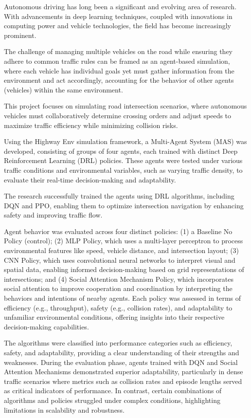 Autonomous driving has long been a significant and evolving area of research. With advancements in deep learning techniques, coupled with 
innovations in computing power and vehicle technologies, the field has become increasingly prominent. 

The challenge of managing multiple vehicles on the road while ensuring they adhere to common traffic rules can be framed as an agent-based simulation,
 where each vehicle has individual goals yet must gather information from the environment and act accordingly, accounting for the behavior of other 
 agents (vehicles) within the same environment.

This project focuses on simulating road intersection scenarios, where autonomous vehicles must collaboratively determine crossing orders and adjust 
speeds to maximize traffic efficiency while minimizing collision risks. 

Using the Highway Env simulation framework, a Multi-Agent System (MAS) was developed, consisting of groups of four agents, each trained with 
distinct Deep Reinforcement Learning (DRL) policies. These agents were tested under various traffic conditions and environmental variables, 
such as varying traffic density, to evaluate their real-time decision-making and adaptability. 

The research successfully trained the agents using DRL algorithms, including DQN and PPO, enabling them to optimize intersection navigation 
by enhancing safety and improving traffic flow. 

Agent behavior was evaluated across four distinct policies: 
(1) a Baseline No Policy (control); (2) MLP Policy, which uses a multi-layer perceptron to process environmental features like speed, vehicle 
distance, and intersection layout; (3) CNN Policy, which uses convolutional neural networks to interpret visual and spatial data, 
enabling informed decision-making based on grid representations of intersections; and (4) Social Attention Mechanism Policy, 
which incorporates social attention to improve cooperation and coordination by interpreting the behaviors and intentions of nearby agents. 
Each policy was assessed in terms of efficiency (e.g., throughput), safety (e.g., collision rates), and adaptability to unfamiliar environmental 
conditions, offering insights into their respective decision-making capabilities.

The algorithms were classified into performance categories such as efficiency, safety, and adaptability, providing a clear understanding of 
their strengths and weaknesses. 
During the evaluation phase, agents trained with DQN and Social Attention Mechanisms demonstrated superior adaptability, particularly 
in dense traffic scenarios where metrics such as collision rates and episode lengths served as critical indicators of performance. 
In contrast, certain combinations of algorithms and policies struggled under complex conditions, highlighting limitations in scalability and
robustness. 



